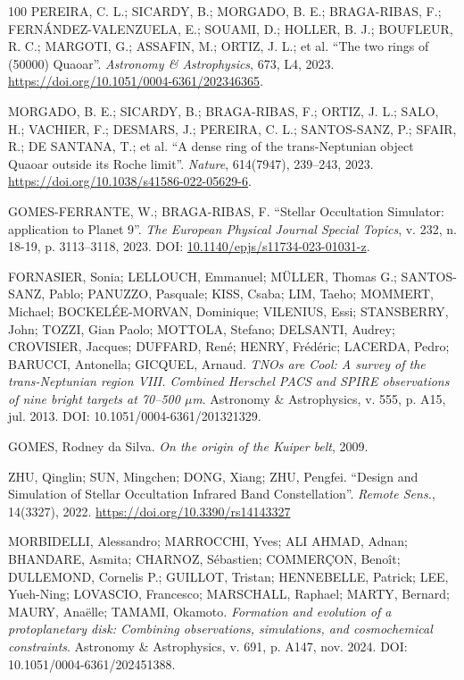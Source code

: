 \documentclass[msc]{on} %
\begin{document}
\begin{thebibliography}{100}
 PEREIRA, C. L.; SICARDY, B.; MORGADO, B. E.; BRAGA-RIBAS, F.; FERNÁNDEZ-VALENZUELA, E.; SOUAMI, D.; HOLLER, B. J.; BOUFLEUR, R. C.; MARGOTI, G.; ASSAFIN, M.; ORTIZ, J. L.; et al. ``The two rings of (50000) Quaoar''. \emph{Astronomy \& Astrophysics}, 673, L4, 2023. \url{https://doi.org/10.1051/0004-6361/202346365}.

 MORGADO, B. E.; SICARDY, B.; BRAGA-RIBAS, F.; ORTIZ, J. L.; SALO, H.; VACHIER, F.; DESMARS, J.; PEREIRA, C. L.; SANTOS-SANZ, P.; SFAIR, R.; DE SANTANA, T.; et al. ``A dense ring of the trans-Neptunian object Quaoar outside its Roche limit''. \emph{Nature}, 614(7947), 239--243, 2023. \url{https://doi.org/10.1038/s41586-022-05629-6}.

 GOMES-FERRANTE, W.; BRAGA-RIBAS, F. ``Stellar Occultation Simulator: application to Planet 9''. \emph{The European Physical Journal Special Topics}, v. 232, n. 18-19, p. 3113--3118, 2023. DOI: \href{https://doi.org/10.1140/epjs/s11734-023-01031-z}{10.1140/epjs/s11734-023-01031-z}.

 FORNASIER, Sonia; LELLOUCH, Emmanuel; MÜLLER, Thomas G.; SANTOS-SANZ, Pablo; PANUZZO, Pasquale; KISS, Csaba; LIM, Taeho; MOMMERT, Michael; BOCKELÉE-MORVAN, Dominique; VILENIUS, Essi; STANSBERRY, John; TOZZI, Gian Paolo; MOTTOLA, Stefano; DELSANTI, Audrey; CROVISIER, Jacques; DUFFARD, René; HENRY, Frédéric; LACERDA, Pedro; BARUCCI, Antonella; GICQUEL, Arnaud. \textit{TNOs are Cool: A survey of the trans-Neptunian region VIII. Combined Herschel PACS and SPIRE observations of nine bright targets at 70--500 $\mu$m}. Astronomy \& Astrophysics, v. 555, p. A15, jul. 2013. DOI: 10.1051/0004-6361/201321329.

 GOMES, Rodney da Silva. \textit{On the origin of the Kuiper belt}, 2009.

 ZHU, Qinglin; SUN, Mingchen; DONG, Xiang; ZHU, Pengfei. ``Design and Simulation of Stellar Occultation Infrared Band Constellation''. \emph{Remote Sens.}, 14(3327), 2022. \url{https://doi.org/10.3390/rs14143327}

 MORBIDELLI, Alessandro; MARROCCHI, Yves; ALI AHMAD, Adnan; BHANDARE, Asmita; CHARNOZ, S\'ebastien; COMMER\c{C}ON, Beno\^it; DULLEMOND, Cornelis P.; GUILLOT, Tristan; HENNEBELLE, Patrick; LEE, Yueh-Ning; LOVASCIO, Francesco; MARSCHALL, Raphael; MARTY, Bernard; MAURY, Ana\"elle; TAMAMI, Okamoto. \textit{Formation and evolution of a protoplanetary disk: Combining observations, simulations, and cosmochemical constraints}. Astronomy \& Astrophysics, v. 691, p. A147, nov. 2024. DOI: 10.1051/0004-6361/202451388.


\end{thebibliography}
\end{document}
